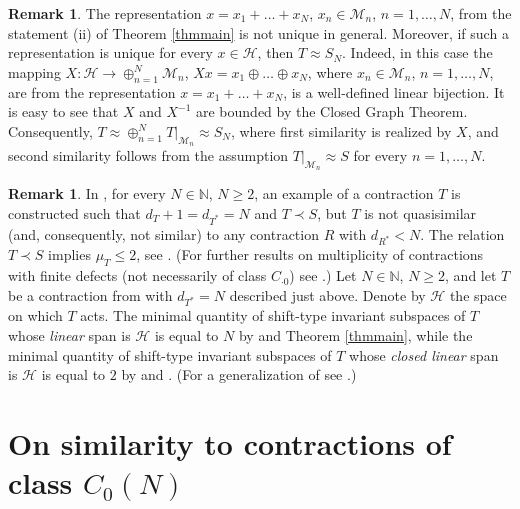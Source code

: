 \documentclass[a4paper,oneside,11pt]{amsart}
\numberwithin{equation}{section}
\theoremstyle{plain}
\theoremstyle{definition}
\newtheorem{remark}[theorem]{Remark}
\begin{document}
\begin{remark} The representation  $x=x_1+\ldots+x_N$, $x_n\in\mathcal M_n$, $n=1,\ldots, N$, 
from the statement (ii) of Theorem \ref{thmmain} is not unique in general. Moreover, 
if such a representation is unique for every $x\in\mathcal H$, then $T\approx S_N$. Indeed, in this case 
the mapping $X\colon \mathcal H\to\oplus_{n=1}^N\mathcal M_n$, $Xx=x_1\oplus\ldots\oplus x_N$, 
where $x_n\in\mathcal M_n$, $n=1,\ldots, N$, are from the representation $x=x_1+\ldots+x_N$, 
is a well-defined linear bijection.
It is easy to see that $X$ and $X^{-1}$ are bounded by the Closed Graph Theorem. 
 Consequently, $T\approx \oplus_{n=1}^N T|_{\mathcal M_n}\approx S_N$, 
where first similarity  is realized by $X$, and second similarity follows from the assumption 
$T|_{\mathcal M_n}\approx S$ for every  $n=1,\ldots, N$. 
\end{remark}

\begin{remark} 
In \cite{vm}, for every $N\in\mathbb N$,  $N\geq 2$,  an example of a contraction $T$ is constructed such that 
$d_T+1=d_{T^*}=N$ and $T\prec S$, but $T$ is not quasisimilar (and, consequently, not similar) to any contraction 
$R$ with $d_{R^*}<N$.  The relation $T\prec S$ implies  $\mu_T\leq 2$, see \cite{sznf74}. 
(For further results on multiplicity of contractions with finite defects (not necessarily of class $C_{\cdot 0}$) see \cite{vasmult}.)
Let  $N\in\mathbb N$,  $N\geq 2$, and let $T$ be a contraction from \cite{vm} with $d_{T^*}=N$ described just above. 
Denote by $\mathcal H$ the space on which $T$ acts. The minimal quantity of shift-type invariant subspaces of $T$ 
whose \emph{linear} span is  $\mathcal H$ is equal to $N$ by \cite{vm} and Theorem \ref{thmmain},  while  the minimal quantity of shift-type invariant subspaces of $T$ 
whose \emph{closed linear} span is  $\mathcal H$ is equal to $2$ by \cite{gamal22} and \cite{sznf74}. (For a generalization of \cite{vm} see \cite{popescu}.) 
\end{remark}


\section{On similarity to contractions of class $C_0(N)$}
\end{document}
